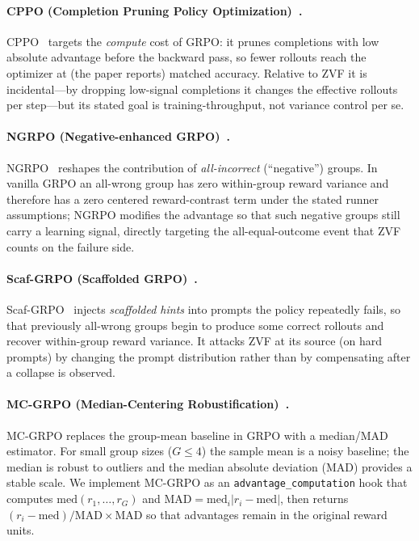\paragraph{CPPO (Completion Pruning Policy Optimization)~\cite{lin2025cppo}.}
CPPO~\citep{lin2025cppo} targets the \emph{compute} cost of GRPO: it prunes
completions with low absolute advantage before the backward pass, so fewer
rollouts reach the optimizer at (the paper reports) matched accuracy. Relative
to ZVF it is incidental---by dropping low-signal completions it changes the
effective rollouts per step---but its stated goal is training-throughput, not
variance control per se.

\paragraph{NGRPO (Negative-enhanced GRPO)~\cite{nan2025ngrpo}.}
NGRPO~\citep{nan2025ngrpo} reshapes the contribution of \emph{all-incorrect}
(``negative'') groups. In vanilla GRPO an all-wrong group has zero within-group
reward variance and therefore has a zero centered reward-contrast term under
the stated runner assumptions; NGRPO modifies the
advantage so that such negative groups still carry a learning signal, directly
targeting the all-equal-outcome event that ZVF counts on the failure side.

\paragraph{Scaf-GRPO (Scaffolded GRPO)~\cite{zhang2025scaffgrpo}.}
Scaf-GRPO~\citep{zhang2025scaffgrpo} injects \emph{scaffolded hints} into prompts the
policy repeatedly fails, so that previously all-wrong groups begin to produce
some correct rollouts and recover within-group reward variance. It attacks ZVF
at its source (on hard prompts) by changing the prompt distribution rather than
by compensating after a collapse is observed.

\paragraph{MC-GRPO (Median-Centering Robustification)~\cite{mcgrpo2025}.}
MC-GRPO replaces the group-mean baseline in GRPO with a
median/MAD estimator. For small group sizes ($G \le 4$) the sample
mean is a noisy baseline; the median is robust to outliers and the
median absolute deviation (MAD) provides a stable scale. We
implement MC-GRPO as an \texttt{advantage\_computation} hook that
computes $\mathrm{med}(r_1,\dots,r_G)$ and
$\mathrm{MAD} = \mathrm{med}_i|r_i - \mathrm{med}|$, then returns
$(r_i - \mathrm{med}) / \mathrm{MAD} \times \mathrm{MAD}$ so that
advantages remain in the original reward units.

